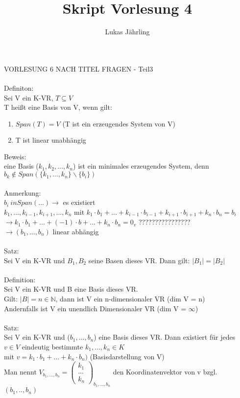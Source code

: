 \documentclass{scrartcl}
\title{Skript Vorlesung 4}
\author{Lukas Jährling}
\begin{document}
	\large
	VORLESUNG 6 NACH TITEL FRAGEN - Teil3
	\normalsize
	\\
	\\
	Definiton:\\
	Sei V ein K-VR, $T \subseteq V$ \\
	T heißt eine Basis von V, wenn gilt:\\
	\begin{enumerate}
		\item $Span(T)=V$ (T ist ein erzeugendes System von V)
		\item T ist linear unabhängig
	\end{enumerate}
	Beweis:\\
	eine Basis ($k_1, k_2, ..., k_n$) ist ein minimales erzeugendes System, denn $b_k \not \in Span(\{ k_1, ..., k_n  \}  \backslash \{ b_i  \})$\\ \\
	Anmerkung:\\
	$b_i \ in Span(...) \rightarrow$ es existiert\\
	$k_1,...,k_{i-1},k_{i+1},...,k_n$ mit $k_1\cdot b_1 + ... +k_{i-1} \cdot b_{i-1} + k_{i+1} \cdot b_{i+1} + k_n \cdot b_n = b_i$ \\
	$\rightarrow k_1 \cdot b_1 + ... + (-1)\cdot b + ... + k_n \cdot b_n = 0_v$ ????????????????  \\
	$\rightarrow (b_1,...,b_n)$ linear abhängig \\ \\
	Satz: \\
	Sei V ein K-VR und $B_1,B_2$ seine Basen dieses VR. Dann gilt: $\vert B_1 \vert = \vert B_2 \vert$ \\ \\
	Definition:\\
	Sei V ein K-VR und B eine Basis dieses VR.\\
	Gilt: $\vert B \vert = n \in \mathbb{N}$, dann ist V ein n-dimensionaler VR (dim V = n)\\
	Andernfalls ist V ein unendlich Dimensionaler VR (dim V = $\infty$) \\ \\
	Satz:\\
	Sei V ein K-VR und ($b_1,...,b_n$) eine Basis dieses VR. Dann existiert für jedes $v \in V$ eindeutig bestimmte $k_1,...,k_n \in K$ \\mit $v=k_1\cdot b_1 + ... + k_n\cdot b_n)$ (Basisdarstellung von V)\\
	Man nennt $V_{b_1,...,b_n}=\begin{pmatrix}
		k_1 \\ ... \\ k_n
	\end{pmatrix}_{b_1,...,b_n}$ den Koordinatenvektor von v bzgl. $(b_1,..,b_n)$
	
		
		
\end{document}
